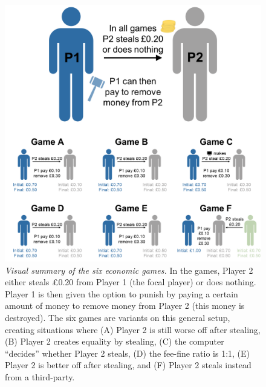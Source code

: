 \documentclass[
  man, donotrepeattitle,floatsintext]{apa6}
\begin{document}
\begin{figure}
\includegraphics[width=1\linewidth]{images/games} \caption{\emph{Visual summary of the six economic games.} In the
games, Player 2 either steals £0.20 from Player 1 (the focal player) or does
nothing. Player 1 is then given the option to punish by paying a certain amount
of money to remove money from Player 2 (this money is destroyed). The six games
are variants on this general setup, creating situations where (A) Player 2 is
still worse off after stealing, (B) Player 2 creates equality by stealing, (C)
the computer ``decides'' whether Player 2 steals, (D) the fee-fine ratio is 1:1,
(E) Player 2 is better off after stealing, and (F) Player 2 steals instead from
a third-party.}\label{fig:plotGames}
\end{figure}
\end{document}
